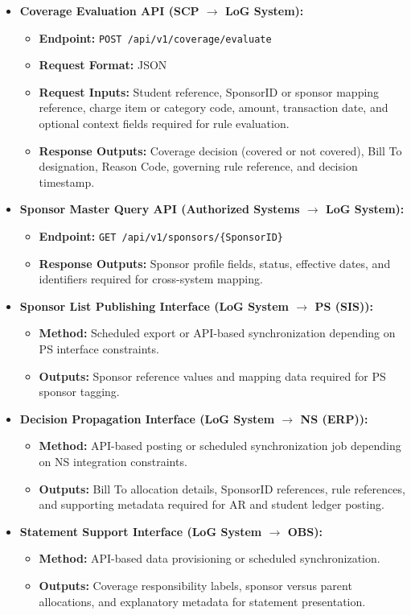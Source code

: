 \documentclass[12pt,a4paper]{article}
\begin{document}
\begin{itemize}
  \item \textbf{Coverage Evaluation API (SCP $\rightarrow$ LoG System):}
  \begin{itemize}
    \item \textbf{Endpoint:} \texttt{POST /api/v1/coverage/evaluate}
    \item \textbf{Request Format:} JSON
    \item \textbf{Request Inputs:} Student reference, SponsorID or sponsor mapping reference, charge item or category code, amount, transaction date, and optional context fields required for rule evaluation.
    \item \textbf{Response Outputs:} Coverage decision (covered or not covered), Bill To designation, Reason Code, governing rule reference, and decision timestamp.
  \end{itemize}

  \item \textbf{Sponsor Master Query API (Authorized Systems $\rightarrow$ LoG System):}
  \begin{itemize}
    \item \textbf{Endpoint:} \texttt{GET /api/v1/sponsors/\{SponsorID\}}
    \item \textbf{Response Outputs:} Sponsor profile fields, status, effective dates, and identifiers required for cross-system mapping.
  \end{itemize}

  \item \textbf{Sponsor List Publishing Interface (LoG System $\rightarrow$ PS (SIS)):}
  \begin{itemize}
    \item \textbf{Method:} Scheduled export or API-based synchronization depending on PS interface constraints.
    \item \textbf{Outputs:} Sponsor reference values and mapping data required for PS sponsor tagging.
  \end{itemize}

  \item \textbf{Decision Propagation Interface (LoG System $\rightarrow$ NS (ERP)):}
  \begin{itemize}
    \item \textbf{Method:} API-based posting or scheduled synchronization job depending on NS integration constraints.
    \item \textbf{Outputs:} Bill To allocation details, SponsorID references, rule references, and supporting metadata required for AR and student ledger posting.
  \end{itemize}

  \item \textbf{Statement Support Interface (LoG System $\rightarrow$ OBS):}
  \begin{itemize}
    \item \textbf{Method:} API-based data provisioning or scheduled synchronization.
    \item \textbf{Outputs:} Coverage responsibility labels, sponsor versus parent allocations, and explanatory metadata for statement presentation.
  \end{itemize}
\end{itemize}
\end{document}

